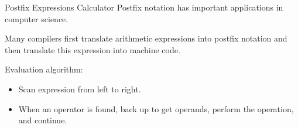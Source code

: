 \documentclass[14pt,aspectratio=1610]{beamer}
\begin{document}
\begin{frame}{Postfix Expressions Calculator}
Postfix notation has important applications in computer science.

Many compilers first translate arithmetic expressions into postfix notation and then translate this expression into machine code.

Evaluation algorithm:\vspace{-0.5em}
\begin{itemize}
  \item
    Scan expression from left to right.
  \item
    When an operator is found, back up to get operands, perform the operation, and continue.
\end{itemize}
\end{frame}
\end{document}
